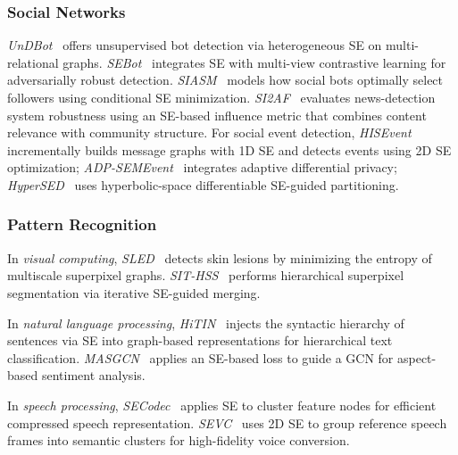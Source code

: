 \subsubsection{Social Networks}

\emph{UnDBot}~\cite{peng2024zjyun} offers unsupervised bot detection via
heterogeneous SE on multi-relational graphs.
\emph{SEBot}~\cite{yang2024sebot} integrates SE with multi-view contrastive
learning for adversarially robust detection.
\emph{SIASM}~\cite{zeng2024socialbots} models how social bots optimally select
followers using conditional SE minimization.
\emph{SI2AF}~\cite{zeng2025si2af} evaluates news-detection system robustness
using an SE-based influence metric that combines content relevance with
community structure.
For social event detection, \emph{HISEvent}~\cite{cao2024socialevent}
incrementally builds message graphs with 1D SE and detects events using 2D SE
optimization; \emph{ADP-SEMEvent}~\cite{yang2024eventdetect} integrates
adaptive differential privacy; \emph{HyperSED}~\cite{yu2024hyperSED} uses
hyperbolic-space differentiable SE-guided partitioning.

\subsubsection{Pattern Recognition}

In \emph{visual computing}, \emph{SLED}~\cite{zeng2023lesion} detects skin
lesions by minimizing the entropy of multiscale superpixel graphs.
\emph{SIT-HSS}~\cite{xie2025superpixel} performs hierarchical superpixel
segmentation via iterative SE-guided merging.

In \emph{natural language processing}, \emph{HiTIN}~\cite{zhu2023HiTIN}
injects the syntactic hierarchy of sentences via SE into graph-based
representations for hierarchical text classification.
\emph{MASGCN}~\cite{huang2025MASGCN} applies an SE-based loss to guide a GCN
for aspect-based sentiment analysis.

In \emph{speech processing}, \emph{SECodec}~\cite{wang2024secodecSpeech}
applies SE to cluster feature nodes for efficient compressed speech
representation.
\emph{SEVC}~\cite{wang2025voice} uses 2D SE to group reference speech frames
into semantic clusters for high-fidelity voice conversion.
